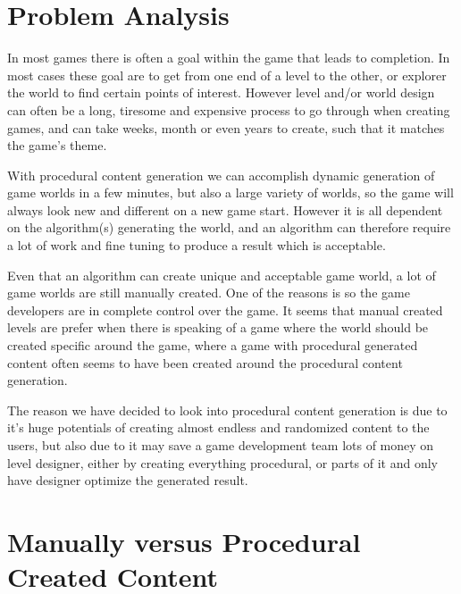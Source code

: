 \label{ProblemAnalysis}
\section{Problem Analysis}

In most games there is often a goal within the game that leads to completion. In most cases these goal are to get from one end of a level to the other, or explorer the world to find certain points of interest. However level and/or world design can often be a long, tiresome and expensive process to go through when creating games, and can take weeks, month or even years to create, such that it matches the game's theme.

With procedural content generation we can accomplish dynamic generation of game worlds in a few minutes, but also a large variety of worlds, so the game will always look new and different on a new game start. However it is all dependent on the algorithm(s) generating the world, and an algorithm can therefore require a lot of work and fine tuning to produce a result which is acceptable.

Even that an algorithm can create unique and acceptable game world, a lot of game worlds are still manually created. One of the reasons is so the game developers are in complete control over the game. It seems that manual created levels are prefer when there is speaking of a game where the world should be created specific around the game, where a game with procedural generated content often seems to have been created around the procedural content generation.

The reason we have decided to look into procedural content generation is due to it's huge potentials of creating almost endless and randomized content to the users, but also due to it may save a game development team lots of money on level designer, either by creating everything procedural, or parts of it and only have designer optimize the generated result.


\section{Manually versus Procedural Created Content}

